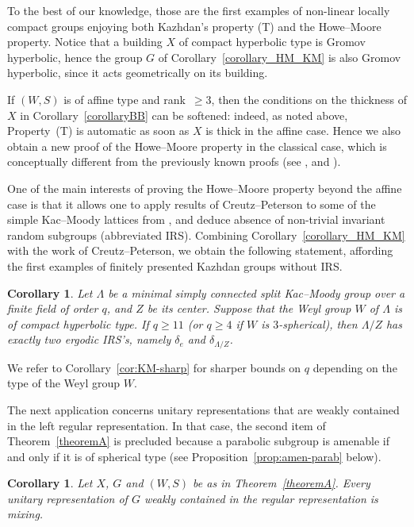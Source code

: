 \documentclass[12pt,a4paper]{amsproc}
\newtheorem{corintro}[thmintro]{Corollary}
\theoremstyle{definition}
\begin{document}
To the best of our knowledge, those are the first   examples of non-linear locally compact groups enjoying both Kazhdan's property (T) and the Howe--Moore property. Notice that a building $X$ of compact hyperbolic type is Gromov hyperbolic, hence the group $G$ of Corollary~\ref{corollary_HM_KM} is also Gromov hyperbolic, since it acts geometrically on its building. 


If $(W, S)$ is of affine type and rank~$\geq 3$, then the conditions on the thickness of $X$ in Corollary~\ref{corollaryBB} can be softened: indeed, as noted above, Property~(T) is automatic as soon as $X$ is thick in the affine case. Hence we also obtain a new proof of the Howe--Moore property in the classical case, which is conceptually different from the previously known proofs  (see \cite{HoweMoore1979}, \cite[Theorem~2.2.20]{Zimmer1984} and \cite{Ciobotaru}).

\medskip
One of the main interests of proving the Howe--Moore property beyond the affine case is that it allows one to apply results of Creutz--Peterson \cite{CrePet, CrePet2} to  some of the simple Kac--Moody lattices from \cite{CapRem}, and deduce absence of non-trivial invariant random  subgroups (abbreviated IRS). Combining Corollary~\ref{corollary_HM_KM} with the work of Creutz--Peterson, we obtain the following statement, affording the first examples of finitely presented Kazhdan groups without IRS.

\begin{corintro}
\label{corollary_KM}
Let $\Lambda$ be a minimal simply connected split Kac--Moody group over a finite field of order $q$, and $Z$ be its center. Suppose that the Weyl group $W$ of $\Lambda$ is of compact hyperbolic type. If $q \geq 11$ (or $q \geq 4$ if $W$ is $3$-spherical), then   $\Lambda/Z$ has exactly two ergodic IRS's, namely $\delta_e$ and $\delta_{\Lambda/Z}$. 
\end{corintro}
	
 We refer to Corollary~\ref{cor:KM-sharp} for sharper bounds on $q$ depending on the type of the Weyl group $W$. 
 
 \medskip
The next application concerns unitary representations that are weakly contained in the left regular representation. In that case, the second item of Theorem~\ref{theoremA} is precluded because a parabolic subgroup is amenable if and only if it is of spherical type (see Proposition~\ref{prop:amen-parab} below).

\begin{corintro}
\label{corollaryC}
Let $X$, $G$ and $(W,S)$ be as in Theorem~\ref{theoremA}. Every unitary representation of $G$ weakly contained in the regular representation is mixing. 
\end{corintro}
\end{document}
